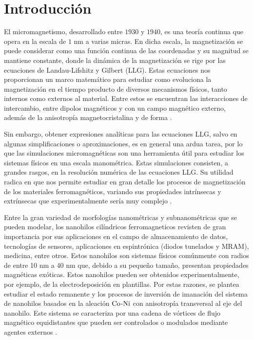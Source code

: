 \newpage
\section{Introducción}

El micromagnetismo, desarrollado entre $1930$ y $1940$, es una teoría continua que opera en la escala de $1$ nm a varias micras. En dicha escala, la magnetización se puede considerar como una función continua de las coordenadas y su magnitud se mantiene constante, donde la dinámica de la magnetización se rige por las  ecuaciones de Landau-Lifshitz y Gilbert (LLG). Estas ecuaciones nos proporcionan un marco matemático para estudiar como evoluciona la magnetización en el tiempo producto de diversos mecanismos físicos, tanto internos como externos al material. Entre estos se encuentran las interacciones de intercambio, entre dipolos magnéticos y con un campo magnético externo, además de la anisotropía magnetocristalina y de forma \cite{KronmüllerMicromagnetism,Exl2020}.

\vspace{10pt}

Sin embargo, obtener expresiones analíticas para las ecuaciones LLG, salvo en algunas simplificaciones o aproximaciones, es en general una ardua tarea, por lo que las simulaciones micromagnéticas son una herramienta útil para estudiar los sistemas físicos en una escala manométrica. Estas simulaciones consisten, a grandes rasgos, en la resolución numérica de las ecuaciones LLG. Su utilidad radica en que nos permite estudiar en gran detalle los procesos de magnetización de los materiales ferromagnéticos, variando sus propiedades intrínsecas y extrínsecas que experimentalmente sería muy complejo \cite{Tomorrow}. 

\vspace{10pt}

Entre la gran variedad de morfologías nanométricas y subnanométricas que se pueden modelar, los nanohilos cilíndricos ferromagneticos revisten de gran importancia por sus aplicaciones en el campo de almacenamiento de datos, tecnologías de sensores, aplicaciones en espintrónica (diodos tunelados y MRAM), medicina, entre otros. Estos nanohilos son sistemas físicos comúnmente con radios de entre 10 nm a 40 nm que, debido a su pequeño tamaño, presentan propiedades magnéticas exóticas. Estos nanohilos pueden ser obtenidos experimentalmente, por ejemplo, de la electrodeposición en plantillas. Por estas razones, se plantea estudiar el estado remanente y los procesos de inversión de imanación del sistema de nanohilos basados en la aleación $\ce{Co}$-$\ce{Ni}$ con anisotropía transversal al eje del nanohilo. Este sistema se caracteriza por una cadena de vórtices de flujo magnético equidistantes que pueden ser controlados o modulados mediante agentes externos \cite{ExoticMagneticConfiguration}. 